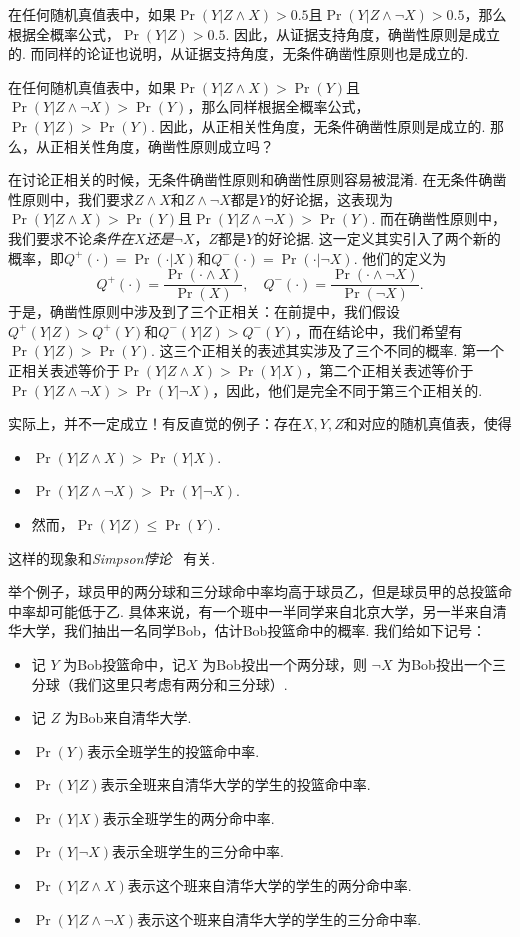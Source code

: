 在任何随机真值表中，如果$\Pr(Y|Z\wedge X)>0.5$且$\Pr(Y|Z\wedge\neg X)>0.5$，那么根据全概率公式，$\Pr(Y|Z)>0.5$. 因此，从证据支持角度，确凿性原则是成立的. 而同样的论证也说明，从证据支持角度，无条件确凿性原则也是成立的.

在任何随机真值表中，如果$\Pr(Y|Z\wedge X)>\Pr(Y)$且$\Pr(Y|Z\wedge\neg X)>\Pr(Y)$，那么同样根据全概率公式，$\Pr(Y|Z)>\Pr(Y)$. 因此，从正相关性角度，无条件确凿性原则是成立的. 那么，从正相关性角度，确凿性原则成立吗？

\begin{remark}
    在讨论正相关的时候，无条件确凿性原则和确凿性原则容易被混淆. 在无条件确凿性原则中，我们要求$Z\wedge X$和$Z\wedge\neg X$都是$Y$的好论据，这表现为$\Pr(Y|Z\wedge X)>\Pr(Y)$且$\Pr(Y|Z\wedge\neg X)>\Pr(Y)$. 而在确凿性原则中，我们要求不论\textit{条件在$X$还是$\neg X$}，$Z$都是$Y$的好论据. 这一定义其实引入了两个新的概率，即$Q^+(\cdot)=\Pr(\cdot|X)$和$Q^-(\cdot)=\Pr(\cdot|\neg X)$. 他们的定义为
    \[
    Q^+(\cdot)=\frac{\Pr(\cdot\wedge X)}{\Pr(X)},\quad Q^-(\cdot)=\frac{\Pr(\cdot\wedge \neg X)}{\Pr(\neg X)}.
    \]
    于是，确凿性原则中涉及到了三个正相关：在前提中，我们假设$Q^+(Y|Z)>Q^+(Y)$和$Q^-(Y|Z)>Q^-(Y)$，而在结论中，我们希望有$\Pr(Y|Z)>\Pr(Y)$. 这三个正相关的表述其实涉及了三个不同的概率. 第一个正相关表述等价于$\Pr(Y|Z\wedge X)>\Pr(Y|X)$，第二个正相关表述等价于$\Pr(Y|Z\wedge\neg X)>\Pr(Y|\neg X)$，因此，他们是完全不同于第三个正相关的.
\end{remark}

实际上，并不一定成立！有反直觉的例子：存在$X, Y, Z$和对应的随机真值表，使得
    \begin{itemize}
        \item $\Pr(Y| Z\wedge X)>\Pr(Y|X)$.
        \item $\Pr(Y| Z \wedge \neg X)>\Pr(Y|\neg X)$.
        \item 然而，$\Pr(Y|Z)\leq \Pr(Y)$.
    \end{itemize}
这样的现象和\textit{Simpson悖论}~\cite{simpsonInterpretationInteractionContingency1951,bickelSexBiasGraduate1975} 有关. 

举个例子，球员甲的两分球和三分球命中率均高于球员乙，但是球员甲的总投篮命中率却可能低于乙. 具体来说，有一个班中一半同学来自北京大学，另一半来自清华大学，我们抽出一名同学Bob，估计Bob投篮命中的概率. 我们给如下记号：

\begin{itemize}
    \item 记 $Y$ 为Bob投篮命中，记$X$ 为Bob投出一个两分球，则 $\neg X$ 为Bob投出一个三分球（我们这里只考虑有两分和三分球）.
    \item 记 $Z$ 为Bob来自清华大学.
    \item $\Pr(Y)$表示全班学生的投篮命中率.
    \item $\Pr(Y|Z)$表示全班来自清华大学的学生的投篮命中率.
    \item $\Pr(Y|X)$表示全班学生的两分命中率.
    \item $\Pr(Y|\neg X)$表示全班学生的三分命中率.
    \item $\Pr(Y|Z \wedge X)$表示这个班来自清华大学的学生的两分命中率.
    \item $\Pr(Y|Z \wedge \neg X)$表示这个班来自清华大学的学生的三分命中率.
\end{itemize}

